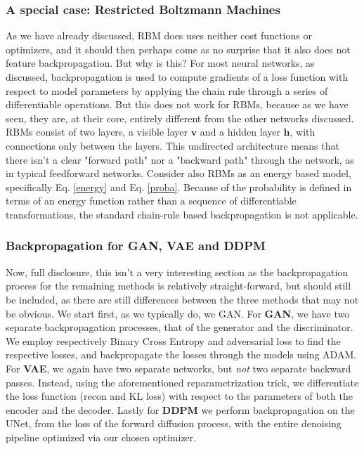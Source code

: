 \documentclass{article}
\begin{document}
\subsubsection{A special case: Restricted Boltzmann Machines}
As we have already discussed, RBM does uses neither cost functions or optimizers, and it should then perhaps come as no surprise that it also does not feature backpropagation. But why is this? For most neural networks, as discussed, backpropagation is used to compute gradients of a loss function with respect to model parameters by applying the chain rule through a series of differentiable operations. But this does not work for RBMs, because as we have seen, they are, at their core, entirely different from the other networks discussed. \newline RBMs consist of two layers, a visible layer $\mathbf{v}$ and a hidden layer $\mathbf{h}$, with connections only between the layers. This undirected architecture means that there isn't a clear "forward path" nor a "backward path" through the network, as in typical feedforward networks.
\newline
Consider also RBMs as an energy based model, specifically Eq. \ref{energy} and Eq. \ref{proba}. Because of the probability is defined in terms of an energy function rather than a sequence of differentiable transformations, the standard chain-rule based backpropagation is not applicable.
\subsubsection{Backpropagation for GAN, VAE and DDPM}
Now, full disclosure, this isn't a very interesting section as the backpropagation process for the remaining methods is relatively straight-forward, but should still be included, as there are still differences between the three methods that may not be obvious. We start first, as we typically do, we GAN.
\newline
For \textbf{GAN}, we have two separate backpropagation processes, that of the generator and the discriminator. We employ respectively Binary Cross Entropy and adversarial loss to find the respective losses, and backpropagate the losses through the models using ADAM. \newline
For \textbf{VAE}, we again have two separate networks, but \emph{not} two separate backward passes. Instead, using the aforementioned reparametrization trick, we differentiate the loss function (recon and KL loss) with respect to the parameters of both the encoder and the decoder.
\newline
Lastly for \textbf{DDPM} we perform backpropagation on the UNet, from the loss of the forward diffusion process, with the entire denoising pipeline optimized via our chosen optimizer.
\end{document}
